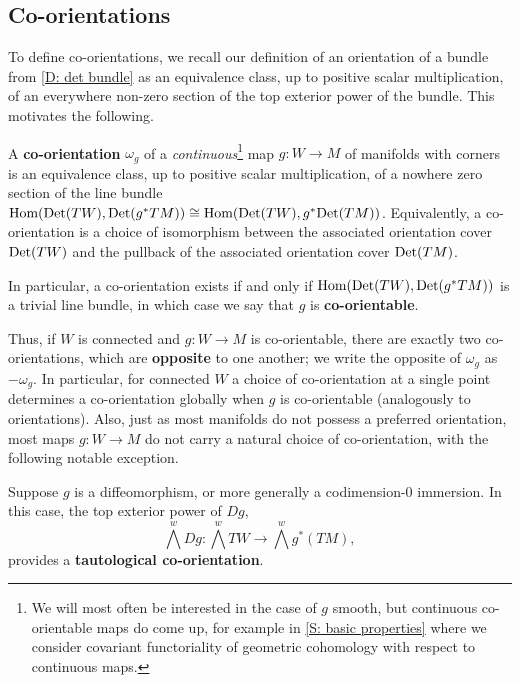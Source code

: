 \subsection{Co-orientations}\label{S: co-orientations}

To define co-orientations, we recall our definition of an orientation of a bundle from \cref{D: det bundle} as an equivalence class, up to positive scalar multiplication, of an everywhere non-zero section of the top exterior power of the bundle.
This motivates the following.

\begin{definition}\label{D: co-orientations}
	A \textbf{co-orientation} $\omega_g$ of a \textit{continuous}\footnote{We will most often be interested in the case of $g$ smooth, but continuous co-orientable maps do come up, for example in \cref{S: basic properties} where we consider covariant functoriality of geometric cohomology with respect to continuous maps.} map $g \colon W \to M$ of manifolds with corners is an equivalence class, up to positive scalar multiplication, of a nowhere zero section of the line bundle $\textup{Hom}({\rm Det}(TW), {\rm Det}(g^*TM)) \cong \textup{Hom}({\rm Det}(TW), g^*{\rm Det}(TM))$.
	Equivalently, a co-orientation is a choice of isomorphism between the associated orientation cover ${\rm Det}(TW)$ and the pullback of the associated orientation cover ${\rm Det}(TM)$.

	In particular, a co-orientation exists if and only if $\textup{Hom}({\rm Det}(TW), {\rm Det}(g^*TM))$ is a trivial line bundle, in which case we say that $g$ is \textbf{co-orientable}.
\end{definition}

Thus, if $W$ is connected and $g \colon W \to M$ is co-orientable, there are exactly two co-orientations, which are \textbf{opposite} to one another; we write the opposite of $\omega_g$ as $-\omega_g$.
In particular, for connected $W$ a choice of co-orientation at a single point determines a co-orientation globally when $g$ is co-orientable (analogously to orientations).
Also, just as most manifolds do not possess a preferred orientation, most maps $g \colon W \to M$ do not carry a natural choice of co-orientation, with the following notable exception.

\begin{definition}\label{D: tautological co-orientation}
	Suppose $g$ is a diffeomorphism, or more generally a codimension-0 immersion. In this case, the top exterior power of $Dg$,
	$$\textstyle{\bigwedge^w} Dg \colon \textstyle{\bigwedge^w} TW \to \textstyle{\bigwedge^w} g^*(TM),$$
	provides a \textbf{tautological co-orientation}.
\end{definition}

